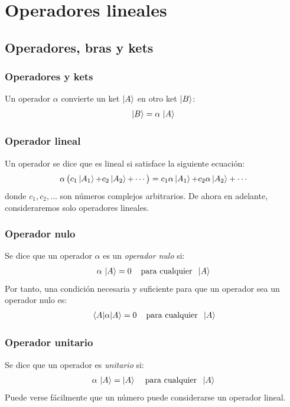 \documentclass[12pt]{beamer}
\begin{document}
\section{Operadores lineales}
\subsection{Operadores, bras y kets}

\begin{frame}
\frametitle{Operadores y kets}
Un operador $\alpha$ convierte un ket $\ket{A}$ en otro ket $\ket{B}$:
\pause
\begin{align*}
\ket{B} = \alpha \, \ket{A}
\end{align*}
\end{frame}
\begin{frame}
\frametitle{Operador lineal}
Un operador se dice que es lineal si satisface la siguiente ecuación:
\pause
\begin{align*}
\alpha \, \big( c_{1} \ket{A_{1}} {+} c_{2} \ket{A_{2}} {+} \cdots  \big) = c_{1} \alpha \ket{A_{1}} {+} c_{2} \alpha \ket{A_{2}} + \cdots
\end{align*}
donde $c_{1}, c_{2}, \ldots$ son números complejos arbitrarios. De ahora en adelante, consideraremos solo operadores lineales.
\end{frame}
\begin{frame}
\frametitle{Operador nulo}
Se dice que un operador $\alpha$ es un \emph{operador nulo} si:
\pause
\begin{align*}
\alpha \, \ket{A} = 0 \hspace{0.4cm} \mbox{para cualquier} \hspace{0.2cm} \ket{A}
\end{align*}
\pause
Por tanto, una condición necesaria y suficiente para que un operador sea un operador nulo es:
\pause
\begin{align*}
\mel{A}{\alpha}{A} = 0 \hspace{0.4cm} \mbox{para cualquier} \hspace{0.2cm} \ket{A}
\end{align*}
\end{frame}
\begin{frame}
\frametitle{Operador unitario}
Se dice que un operador es \emph{unitario} si:
\pause
\begin{align*}
\alpha \, \ket{A} = \ket{A} \hspace{0.4cm} \mbox{para cualquier} \hspace{0.2cm} \ket{A}
\end{align*}
\pause
Puede verse fácilmente que un número puede considerarse un operador lineal.
\end{frame}
\end{document}
